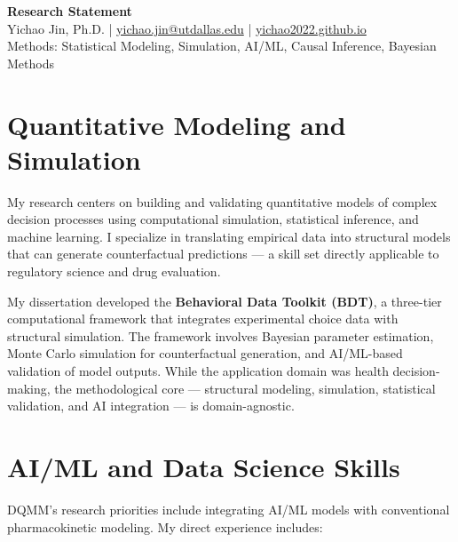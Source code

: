 \documentclass[11pt,a4paper]{article}
\begin{document}
\pagestyle{empty}

\begin{center}
    {\Large \bfseries \sffamily \color{slate} Research Statement} \\
    \vspace{0.2cm}
    {\small Yichao Jin, Ph.D. \quad | \quad \href{mailto:yichao.jin@utdallas.edu}{yichao.jin@utdallas.edu} \quad | \quad \href{https://yichao2022.github.io}{yichao2022.github.io}} \\
    {\small Methods: Statistical Modeling, Simulation, AI/ML, Causal Inference, Bayesian Methods}
\end{center}

\vspace{0.15cm}

\section*{Quantitative Modeling and Simulation}

My research centers on building and validating quantitative models of complex decision processes using computational simulation, statistical inference, and machine learning. I specialize in translating empirical data into structural models that can generate counterfactual predictions --- a skill set directly applicable to regulatory science and drug evaluation.

My dissertation developed the \textbf{Behavioral Data Toolkit (BDT)}, a three-tier computational framework that integrates experimental choice data with structural simulation. The framework involves Bayesian parameter estimation, Monte Carlo simulation for counterfactual generation, and AI/ML-based validation of model outputs. While the application domain was health decision-making, the methodological core --- structural modeling, simulation, statistical validation, and AI integration --- is domain-agnostic.

\section*{AI/ML and Data Science Skills}

DQMM's research priorities include integrating AI/ML models with conventional pharmacokinetic modeling. My direct experience includes:
\end{document}
